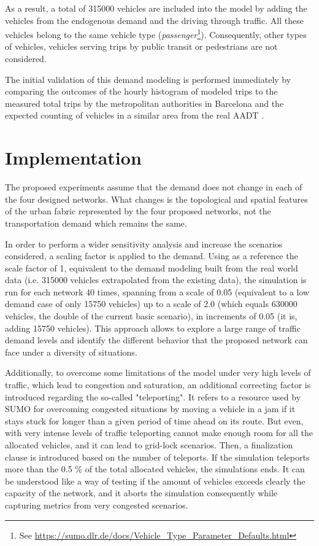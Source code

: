 \documentclass[11pt]{article}
\begin{document}
As a result, a total of 315000 vehicles are included into the model by adding the vehicles from the endogenous demand and the driving through traffic. All these vehicles belong to the same vehicle type (\textit{passenger}\footnote{See \url{https://sumo.dlr.de/docs/Vehicle_Type_Parameter_Defaults.html}}). Consequently, other types of vehicles, vehicles serving trips by public transit or pedestrians are not considered.

The initial validation of this demand modeling is performed immediately by comparing the outcomes of the hourly histogram of modeled trips to the measured total trips by the metropolitan authorities in Barcelona \citep{AreadeBarcelona.AutoritatdelTransportMetropolita2020} and the expected counting of vehicles in a similar area from the real AADT \citep{AjuntamentdeBarcelona2016}.

\section{Implementation}

The proposed experiments assume that the demand does not change in each of the four designed networks. What changes is the topological and spatial features of the urban fabric represented by the four proposed networks, not the transportation demand which remains the same. 

In order to perform a wider sensitivity analysis and increase the scenarios considered, a scaling factor is applied to the demand. Using as a reference the scale factor of 1, equivalent to the demand modeling built from the real world data (i.e. 315000 vehicles extrapolated from the existing data), the simulation is run for each network 40 times, spanning from a scale of 0.05 (equivalent to a low demand case of only 15750 vehicles) up to a scale of 2.0 (which equals 630000 vehicles, the double of the current basic scenario), in increments of 0.05 (it is, adding 15750 vehicles). This approach allows to explore a large range of traffic demand levels and identify the different behavior that the proposed network can face under a diversity of situations.

Additionally, to overcome some limitations of the model under very high levels of traffic, which lead to congestion and saturation, an additional correcting factor is introduced regarding the so-called "teleporting". It refers to a resource used by SUMO for overcoming congested situations by moving a vehicle in a jam if it stays stuck for longer than a given period of time ahead on its route. But even, with very intense levels of traffic teleporting cannot make enough room for all the allocated vehicles, and it can lead to grid-lock scenarios. Then, a finalization clause is introduced based on the number of teleports. If the simulation teleports more than the 0.5 \% of the total allocated vehicles, the simulations ends. It can be understood like a way of testing if the amount of vehicles exceeds clearly the capacity of the network, and it aborts the simulation consequently while capturing metrics from very congested scenarios.
\end{document}
